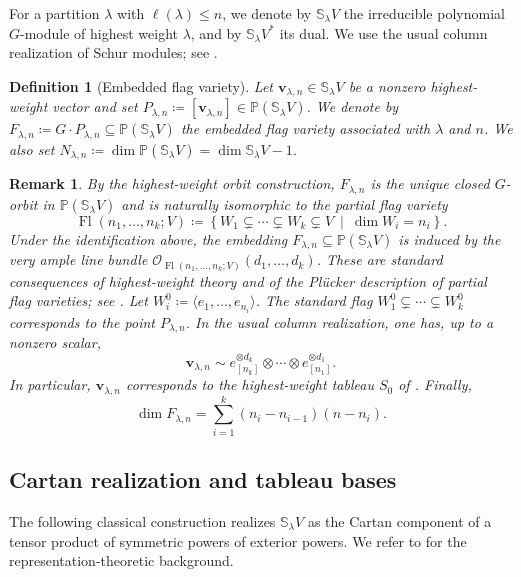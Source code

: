 \documentclass[a4paper,reqno]{amsart}
\theoremstyle{plainnopunct}
\theoremstyle{definitionnopunct}
\newtheorem{definition}[definition]{Definition}
\newtheorem{remark}[remark]{Remark}
\renewcommand{\P}{\mathbb{P}}
\renewcommand{\S}{\mathbb{S}}
\newcommand{\cO}{\mathcal{O}}
\newcommand{\bv}{\mathbf{v}}
\DeclareMathOperator{\Fl}{Fl}
\begin{document}
For a partition $\lambda$ with $\ell(\lambda)\leq n$, we denote by $\S_\lambda V$ the irreducible polynomial $G$-module of highest weight $\lambda$, and by $\S_\lambda V^*$ its dual. We use the usual column realization of Schur modules; see \cite{Fulton1997,FultonHarris1991}.

\begin{definition}[Embedded flag variety]
\label{def: embedded flag variety}
Let $\bv_{\lambda,n}\in\S_\lambda V$ be a nonzero highest-weight vector and set $P_{\lambda,n}
\coloneq
[\bv_{\lambda,n}]
\in
\P(\S_\lambda V)$.
We denote by $F_{\lambda,n}
\coloneq
G\cdot P_{\lambda,n}
\subseteq
\P(\S_\lambda V)$
the embedded flag variety associated with $\lambda$ and $n$. We also set $N_{\lambda,n}
\coloneq
\dim\P(\S_\lambda V)
=
\dim\S_\lambda V-1$.
\end{definition}

\begin{remark}
\label{rem: geometric description embedded flag}
By the highest-weight orbit construction, $F_{\lambda,n}$ is the unique closed $G$-orbit in $\P(\S_\lambda V)$ and is naturally isomorphic to the partial flag variety
\[
\Fl(n_1,\ldots,n_k;V)
\coloneq
\left\{
W_1\subsetneq\cdots\subsetneq W_k\subsetneq V
\ \middle|\
\dim W_i=n_i
\right\}.
\]
Under the identification above, the embedding $F_{\lambda,n}
\subseteq
\P(\S_\lambda V)$ is induced by the very ample line bundle $\cO_{\Fl(n_1,\ldots,n_k;V)}
(d_1,\ldots,d_k)$. These are standard consequences of highest-weight theory and of the Pl\"ucker description of partial flag varieties; see \cite{Fulton1997,FultonHarris1991}. Let $W_i^0
\coloneq
\langle e_1,\ldots,e_{n_i}\rangle$.
The standard flag
$W_1^0
\subsetneq
\cdots
\subsetneq
W_k^0$
corresponds to the point $P_{\lambda,n}$. In the usual column realization, one has, up to a nonzero scalar,
\[
\bv_{\lambda,n}
\sim
e_{[n_k]}^{\otimes d_k}
\otimes\cdots\otimes
e_{[n_1]}^{\otimes d_1}.
\]
In particular, $\bv_{\lambda,n}$ corresponds to the highest-weight tableau $S_0$ of . Finally,
\[\dim F_{\lambda,n}
=
\sum_{i=1}^k
(n_i-n_{i-1})(n-n_i).
\]\end{remark}

\subsection{Cartan realization and tableau bases}
\label{subsect: cartan realization}
The following classical construction realizes $\S_\lambda V$ as the Cartan component of a tensor product of symmetric powers of exterior powers. We refer to \cite{Fulton1997,FultonHarris1991} for the representation-theoretic background.
\end{document}
